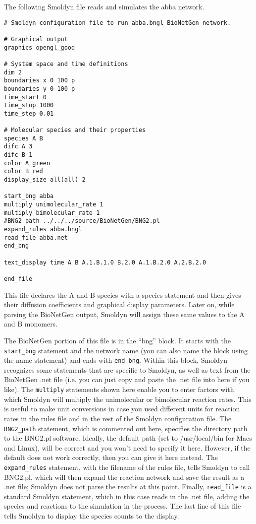 \documentclass {scrbook}
\newcommand {\ttt} {\texttt}
\begin{document}
The following Smoldyn file reads and simulates the abba network.

\begin{lstlisting}[style=SSAC]
# Smoldyn configuration file to run abba.bngl BioNetGen network.

# Graphical output
graphics opengl_good

# System space and time definitions
dim 2
boundaries x 0 100 p
boundaries y 0 100 p
time_start 0
time_stop 1000
time_step 0.01

# Molecular species and their properties
species A B
difc A 3
difc B 1
color A green
color B red
display_size all(all) 2

start_bng abba
multiply unimolecular_rate 1
multiply bimolecular_rate 1
#BNG2_path ../../../source/BioNetGen/BNG2.pl
expand_rules abba.bngl
read_file abba.net
end_bng

text_display time A B A.1.B.1.0 B.2.0 A.1.B.2.0 A.2.B.2.0

end_file
\end{lstlisting}

This file declares the A and B species with a species statement and then gives their diffusion coefficients and graphical display parameters. Later on, while parsing the BioNetGen output, Smoldyn will assign these same values to the A and B monomers.

The BioNetGen portion of this file is in the ``bng'' block. It starts with the \ttt{start\_bng} statement and the network name (you can also name the block using the name statement) and ends with \ttt{end\_bng}. Within this block, Smoldyn recognizes some statements that are specific to Smoldyn, as well as text from the BioNetGen .net file (i.e. you can just copy and paste the .net file into here if you like). The \ttt{multiply} statements shown here enable you to enter factors with which Smoldyn will multiply the unimolecular or bimolecular reaction rates. This is useful to make unit conversions in case you used different units for reaction rates in the rules file and in the rest of the Smoldyn configuration file. The \ttt{BNG2\_path} statement, which is commented out here, specifies the directory path to the BNG2.pl software. Ideally, the default path (set to /usr/local/bin for Macs and Linux), will be correct and you won't need to specify it here. However, if the default does not work correctly, then you can give it here instead. The \ttt{expand\_rules} statement, with the filename of the rules file, tells Smoldyn to call BNG2.pl, which will then expand the reaction network and save the result as a .net file; Smoldyn does not parse the results at this point. Finally, \ttt{read\_file} is a standard Smoldyn statement, which in this case reads in the .net file, adding the species and reactions to the simulation in the process. The last line of this file tells Smoldyn to display the species counts to the display.
\end{document}
